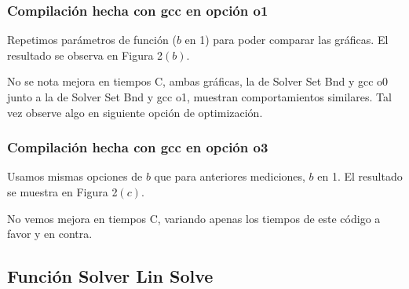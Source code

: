 \subsubsection{Compilación hecha con gcc en opción o1}
Repetimos parámetros de función ($b$ en 1) para poder comparar las gráficas. El resultado se observa en Figura 2$(b)$.

  
No se nota mejora en tiempos C, ambas gráficas, la de Solver Set Bnd y gcc o0 junto a la de Solver Set Bnd y gcc o1, muestran comportamientos similares. Tal vez observe algo en siguiente opción de optimización.



\subsubsection{Compilación hecha con gcc en opción o3}
Usamos mismas opciones de $b$ que para anteriores mediciones, $b$ en 1. El resultado se muestra en Figura 2$(c)$.

  
No vemos mejora en tiempos C, variando apenas los tiempos de este código a favor y en contra. 

\subsection{Función Solver Lin Solve}


